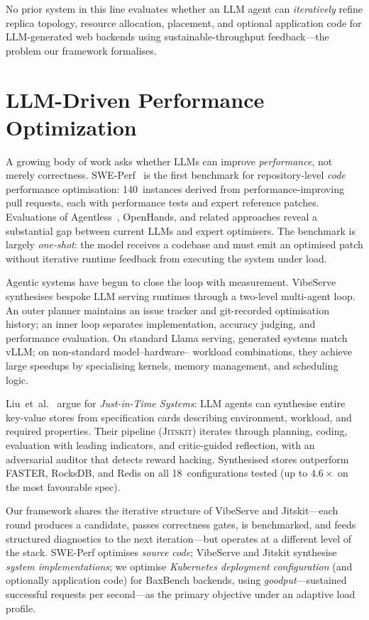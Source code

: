 No prior system in this line evaluates whether an LLM agent can \emph{iteratively}
refine replica topology, resource allocation, placement, and optional
application code for LLM-generated web backends using sustainable-throughput
feedback---the problem our framework formalises.


\section{LLM-Driven Performance Optimization}
\label{sec:rw-llm-perf}

A growing body of work asks whether LLMs can improve \emph{performance}, not
merely correctness.  SWE-Perf~\cite{he2025sweperf} is the first benchmark for
repository-level \emph{code} performance optimisation: 140~instances derived
from performance-improving pull requests, each with performance tests and
expert reference patches.  Evaluations of Agentless~\cite{xia2024agentless},
OpenHands, and related approaches reveal a substantial gap between current LLMs
and expert optimisers.  The benchmark is largely \emph{one-shot}: the model
receives a codebase and must emit an optimised patch without iterative runtime
feedback from executing the system under load.

Agentic systems have begun to close the loop with measurement.
VibeServe~\cite{kamahori2025vibeserve} synthesises bespoke LLM serving runtimes
through a two-level multi-agent loop.  An outer planner maintains an issue
tracker and git-recorded optimisation history; an inner loop separates
implementation, accuracy judging, and performance evaluation.  On standard
Llama serving, generated systems match vLLM; on non-standard model--hardware--
workload combinations, they achieve large speedups by specialising kernels,
memory management, and scheduling logic.

Liu~et~al.~\cite{liu2025jitsystems} argue for \emph{Just-in-Time Systems}:
LLM agents can synthesise entire key-value stores from specification cards
describing environment, workload, and required properties.  Their pipeline
(\textsc{Jitskit}) iterates through planning, coding, evaluation with leading
indicators, and critic-guided reflection, with an adversarial auditor that
detects reward hacking.  Synthesised stores outperform FASTER, RocksDB, and
Redis on all 18~configurations tested (up to $4.6\times$ on the most favourable
spec).

Our framework shares the iterative structure of VibeServe and Jitskit---each
round produces a candidate, passes correctness gates, is benchmarked, and
feeds structured diagnostics to the next iteration---but operates at a different
level of the stack.  SWE-Perf optimises \emph{source code}; VibeServe and
Jitskit synthesise \emph{system implementations}; we optimise \emph{Kubernetes
deployment configuration} (and optionally application code) for BaxBench
backends, using \emph{goodput}---sustained successful requests per second---as
the primary objective under an adaptive load profile.


